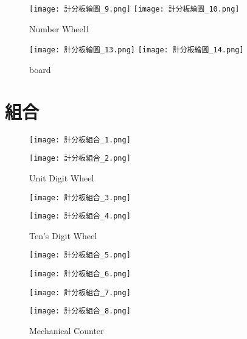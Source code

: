 {\begin{figure}[thb!]
  \centering
  \texttt{[image: 計分板繪圖\_9.png]}
  \centering
  \texttt{[image: 計分板繪圖\_10.png]}
  \caption{Number Wheel1}
  \label{fig:photo8}
\end{figure}

\begin{figure}[thb!]
  \centering
  \texttt{[image: 計分板繪圖\_13.png]}
  \centering
  \texttt{[image: 計分板繪圖\_14.png]}
  \caption{board}
  \label{fig:photo9}
\end{figure}
}

\newpage

\section{組合}
{
\begin{figure}[hbt!]
  \centering
  \texttt{[image: 計分板組合\_1.png]}
\end{figure}
\begin{figure}[hbt!]
  \centering
  \texttt{[image: 計分板組合\_2.png]}
  \caption{Unit Digit Wheel}
  \label{fig:photo10}
\end{figure}

\begin{figure}[hbt!]
  \centering
  \texttt{[image: 計分板組合\_3.png]}
\end{figure}
\begin{figure}[hbt!]
  \centering
  \texttt{[image: 計分板組合\_4.png]}
  \caption{Ten's Digit Wheel}
  \label{fig:photo11}
\end{figure}

\begin{figure}[hbt!]
  \centering
  \texttt{[image: 計分板組合\_5.png]}
\end{figure}
\begin{figure}[hbt!]
  \centering
  \texttt{[image: 計分板組合\_6.png]}
\end{figure}
\begin{figure}[hbt!]
  \centering
  \texttt{[image: 計分板組合\_7.png]}
\end{figure}
\begin{figure}[hbt!]
  \centering
  \texttt{[image: 計分板組合\_8.png]}
  \caption{Mechanical Counter}
  \label{fig:photo12}
\end{figure}
}

